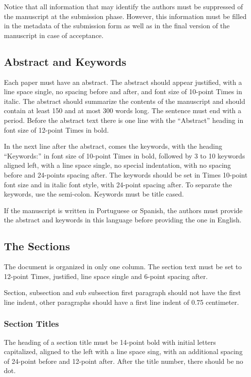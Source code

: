 \documentclass[english, spanish, brazilian]{RBIEarticle} %
\begin{document}
Notice that all information that may identify the authors must be suppressed of the manuscript at the submission phase. However, this information must be filled in the metadata of the submission form as well as in the final version of the manuscript in case of acceptance.


\subsection{Abstract and Keywords}
Each paper must have an abstract. The abstract should appear justified, with a line space single, no spacing before and after, and font size of 10-point Times in italic. The abstract should summarize the contents of the manuscript and should contain at least 150 and at most 300 words long. The sentence must end with a period. Before the abstract text there is one line with the ``Abstract'' heading in font size of 12-point Times in bold.

In the next line after the abstract, comes the keywords, with the heading ``Keywords:'' in font size of 10-point Times in bold, followed by 3 to 10 keywords aligned left, with a line space single, no special indentation, with no spacing before and 24-points spacing after. The keywords should be set in Times 10-point font size and in italic font style, with 24-point spacing after. To separate the keywords, use the semi-colon. Keywords must be title cased.

If the manuscript is written in Portuguese or Spanish, the authors must provide the abstract and keywords in this language before providing the one in English.


\subsection{The Sections}
The document is organized in only one column. The section text must be set to 12-point Times, justified, line space single and 6-point spacing after.

Section, subsection and sub subsection first paragraph should not have the first line indent, other paragraphs should have a first line indent of 0.75 centimeter.


\subsubsection{Section Titles}
The heading of a section title must be 14-point bold with initial letters capitalized, aligned to the left with a line space sing, with an additional spacing of 24-point before and 12-point after. After the title number, there should be no dot.
\end{document}
